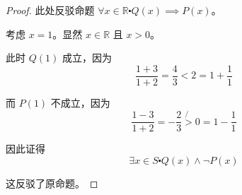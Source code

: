 \begin{example}
    \begin{proof}
        此处反驳命题 $\forall x \in \mathbb{R} \centerdot Q(x) \implies P(x)$。

        考虑 $x = 1$。显然 $x \in \mathbb{R}$ 且 $x > 0$。

        此时 $Q(1)$ 成立，因为
        \[\frac{1+3}{1+2} = \frac{4}{3} < 2=1+\frac{1}{1}\]

        而 $P(1)$ 不成立，因为
        \[\frac{1-3}{1+2} = -\frac{2}{3} \not{>} 0=1-\frac{1}{1}\]

        因此证得
        \[\exists x \in S \centerdot Q(x) \land \neg P(x)\]

        这反驳了原命题。
    \end{proof}
\end{example}